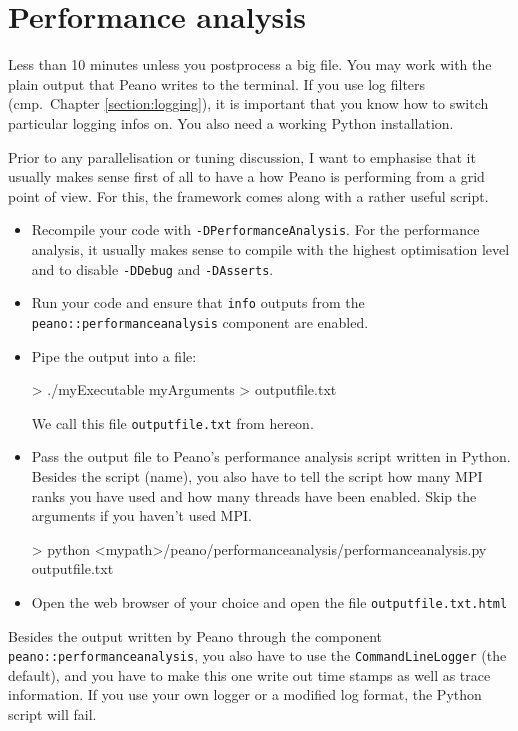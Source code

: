 \section{Performance analysis}
\label{section:performance-analysis}

\chapterDescription
  {
    Less than 10 minutes unless you postprocess a big file.
  }
  {
    You may work with the plain output that Peano writes to the terminal. If you
    use log filters (cmp.~Chapter \ref{section:logging}), it is important that
    you know how to switch particular logging infos on. You also need a working
    Python installation.
  }

\noindent
Prior to any parallelisation or tuning discussion, I want to emphasise that it
usually makes sense first of all to have a how Peano is performing from a grid
point of view. For this, the framework comes along with a rather useful script.

\begin{itemize}
  \item Recompile your code with \texttt{-DPerformanceAnalysis}. For the
    performance analysis, it usually makes sense to compile with the highest
    optimisation level and to disable \texttt{-DDebug} and \texttt{-DAsserts}.
  \item Run your code and ensure that \texttt{info} outputs from the
    \texttt{peano::performanceanalysis} component are enabled.
  \item Pipe the output into a file:
    \begin{code}
> ./myExecutable myArguments > outputfile.txt
    \end{code} 
    We call this file \texttt{outputfile.txt} from hereon.
  \item Pass the output file to Peano's performance analysis script written in
  Python. Besides the script (name), you also have to tell the script how many 
    MPI ranks you have used and how many threads have been enabled. Skip
    the arguments if you haven't used MPI.
    \begin{code}
> python <mypath>/peano/performanceanalysis/performanceanalysis.py outputfile.txt
    \end{code} 
  \item Open the web browser of your choice and open the file
  \texttt{outputfile.txt.html}
\end{itemize}

\begin{remark}
Besides the output written by Peano through the component
\texttt{peano::performanceanalysis}, you also have to use the
\texttt{CommandLineLogger} (the default), and you have to make this one write
out time stamps as well as trace information. If you use your own logger or a
modified log format, the Python script will fail.
\end{remark}

